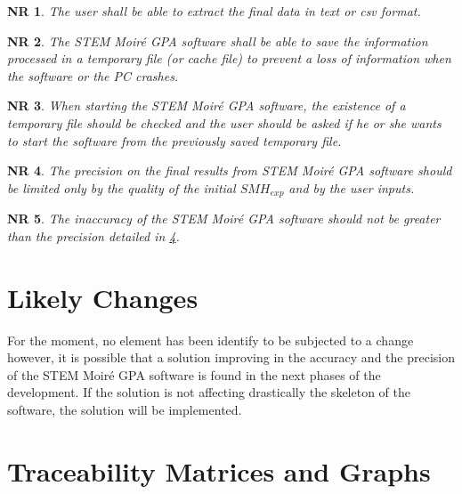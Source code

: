 \documentclass[12pt]{article}
\newcommand{\progname}{STEM Moir{\'e} GPA}
\newtheorem{NR}{NR}
\begin{document}
\begin{NR}
\label{NR_5} 
\normalfont The user shall be able to extract the final data in text or csv format.
\end{NR}

\begin{NR}
\label{NR_6} 
\normalfont The \progname{} software shall be able to save the information processed in a temporary file (or cache file) to prevent a loss of information when the software or the PC crashes.
\end{NR}

\begin{NR}
\label{NR_7} 
\normalfont When starting the \progname{} software, the existence of a temporary file should be checked and the user should be asked if he or she wants to start the software from the previously saved temporary file.
\end{NR}

\begin{NR}
\label{NR_8} 
\normalfont The precision on the final results from \progname{} software should be limited only by the quality of the initial $SMH_{exp}$ and by the user inputs.
\end{NR}

\begin{NR}
\label{NR_9} 
\normalfont The inaccuracy of the \progname{} software should not be greater than the precision detailed in \cref{NR_8}.
\end{NR}


\section{Likely Changes}    

For the moment, no element has been identify to be subjected to a change however, it is possible that a solution improving in the accuracy and the precision of the \progname{} software is found in the next phases of the development. If the solution is not affecting drastically the skeleton of the software, the solution will be implemented.

\section{Traceability Matrices and Graphs}
\end{document}
